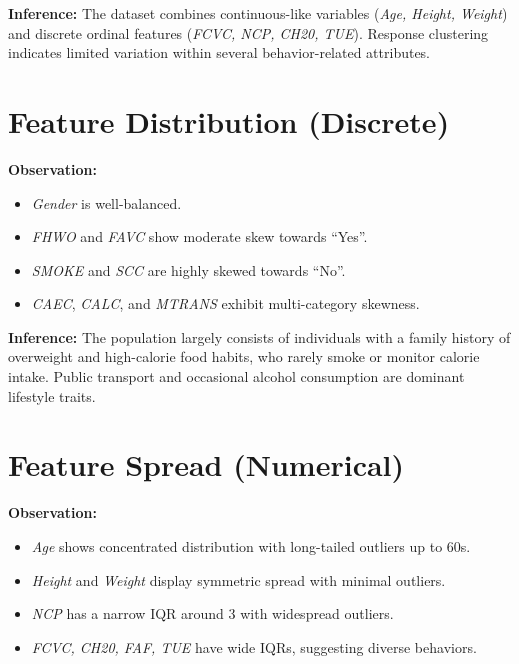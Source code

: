 \textbf{Inference:}
The dataset combines continuous-like variables (\textit{Age, Height, Weight}) and discrete ordinal features (\textit{FCVC, NCP, CH20, TUE}).
Response clustering indicates limited variation within several behavior-related attributes.



\section{Feature Distribution (Discrete)}\label{sec:feature-distribution-(discrete)}

\textbf{Observation:}
\begin{itemize}
    \item \textit{Gender} is well-balanced.
    \item \textit{FHWO} and \textit{FAVC} show moderate skew towards “Yes”.
    \item \textit{SMOKE} and \textit{SCC} are highly skewed towards “No”.
    \item \textit{CAEC}, \textit{CALC}, and \textit{MTRANS} exhibit multi-category skewness.
\end{itemize}

\textbf{Inference:}
The population largely consists of individuals with a family history of overweight and high-calorie food habits, who rarely smoke or monitor calorie intake.
Public transport and occasional alcohol consumption are dominant lifestyle traits.



\section{Feature Spread (Numerical)}\label{sec:feature-spread-(numerical)}

\textbf{Observation:}
\begin{itemize}
    \item \textit{Age} shows concentrated distribution with long-tailed outliers up to 60s.
    \item \textit{Height} and \textit{Weight} display symmetric spread with minimal outliers.
    \item \textit{NCP} has a narrow IQR around 3 with widespread outliers.
    \item \textit{FCVC, CH20, FAF, TUE} have wide IQRs, suggesting diverse behaviors.
\end{itemize}


